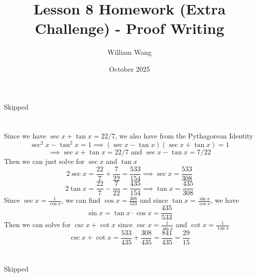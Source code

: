\documentclass{article}
\title{Lesson 8 Homework (Extra Challenge) - Proof Writing}
\author{William Wang}
\date{October 2025}
\begin{document}
\maketitle

\section{}
Skipped
\section{}
Since we have $\sec x + \tan x = 22/7$, we also have from the Pythagorean Identity
\[\sec^2 x - \tan^2 x = 1 \implies (\sec x - \tan x)(\sec x + \tan x) = 1\]
\[\implies \sec x + \tan x = 22/7 \text{ and } \sec x - \tan x = 7/22\]
Then we can just solve for \(\sec x\) and $\tan x$
\[2\sec x = \frac{22}{7} + \frac{7}{22} = \frac{533}{154} \implies \sec x = \frac{533}{308}\]
\[2\tan x = \frac{22}{7} - \frac{7}{22} = \frac{435}{154} \implies \tan x = \frac{435}{308}\]
Since $\sec x = \frac{1}{\cos x}$, we can find $\cos x = \frac{308}{533}$ and since $\tan x= \frac{\sin x}{\cos x}$, we have 
\[\sin x = \tan x \cdot \cos x = \frac{435}{533}\]
Then we can solve for $\csc x + \cot x$ since $\csc x = \frac{1}{\sin x}$ and $\cot x = \frac{1}{\tan x}$
\[\csc x + \cot x = \frac{533}{435} + \frac{308}{435} = \frac{841}{435} = \frac{29}{15}\]
\section{}
Skipped
\end{document}
